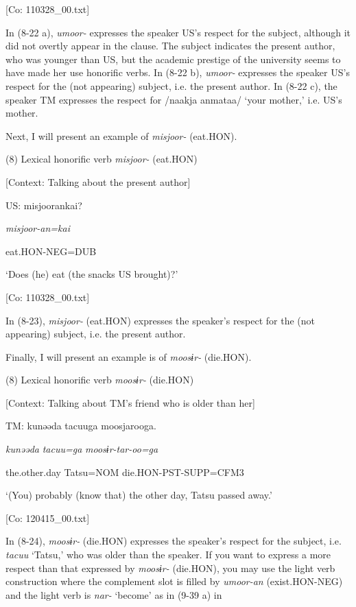       [Co: 110328\_00.txt]

In (8-22 a), \textit{umoor-} expresses the speaker US’s respect for the subject, although it did not overtly appear in the clause. The subject indicates the present author, who was younger than US, but the academic prestige of the university seems to have made her use honorific verbs. In (8-22 b), \textit{umoor-} expresses the speaker US’s respect for the (not appearing) subject, i.e. the present author. In (8-22 c), the speaker TM expresses the respect for /naakja anmataa/ ‘your mother,’ i.e. US’s mother.

Next, I will present an example of \textit{misjoor-} (eat.HON).

(8)  Lexical honorific verb \textit{misjoor-} (eat.HON)

  [Context: Talking about the present author]

  US:  misjoorankai?

    \textit{misjoor{}-an=kai}

    eat.HON-NEG=DUB

    ‘Does (he) eat (the snacks US brought)?’

    [Co: 110328\_00.txt]

In (8-23), \textit{misjoor-} (eat.HON) expresses the speaker’s respect for the (not appearing) subject, i.e. the present author.

  Finally, I will present an example is of \textit{moosɨr-} (die.HON).

(8)  Lexical honorific verb \textit{moosɨr-} (die.HON)

  [Context: Talking about TM’s friend who is older than her]

  TM:  kunəəda  tacuuga  moosjarooga.

    \textit{kunəəda}  \textit{tacuu=ga}  \textit{moosɨr{}-tar-oo=ga}

    the.other.day  Tatsu=NOM  die.HON-PST-SUPP=CFM3

    ‘(You) probably (know that) the other day, Tatsu passed away.’

    [Co: 120415\_00.txt]

In (8-24), \textit{moosɨr-} (die.HON) expresses the speaker’s respect for the subject, i.e. \textit{tacuu} ‘Tatsu,’ who was older than the speaker. If you want to express a more respect than that expressed by \textit{moosɨr-} (die.HON), you may use the light verb construction where the complement slot is filled by \textit{umoor-an} (exist.HON-NEG) and the light verb is \textit{nar-} ‘become’ as in (9-39 a) in 

